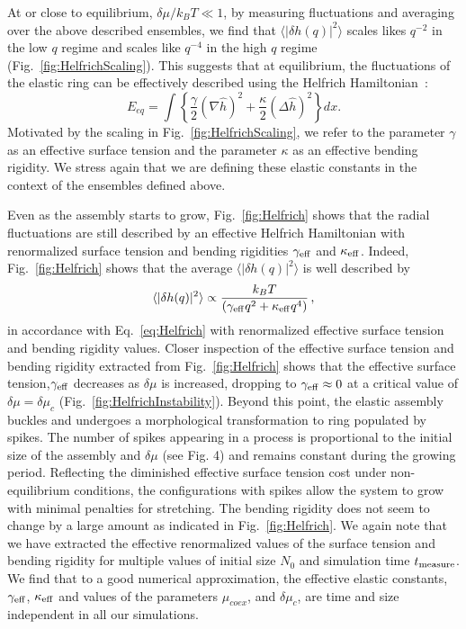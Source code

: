 \documentclass[amsmath,preprintnumbers,10pt,nofootinbib,prl,twocolumn]{revtex4-1}
\begin{document}
At or close to equilibrium, $\delta \mu /k_B T \ll 1$, by measuring fluctuations and averaging over the above described ensembles, we find that $\langle |\delta h(q)|^2 \rangle$ scales likes $q^{-2}$ in the low $q$ regime and scales like $q^{-4}$ in the high $q$ regime (Fig.~\ref{fig:HelfrichScaling}). This suggests that 
at equilibrium, the fluctuations of the elastic ring can be effectively described using the Helfrich Hamiltonian~\cite{W.Helfrich1973}:
\begin{equation}
E_{eq}=\int \left \{\frac{\gamma}{2} (\nabla \hat{h})^2+  \frac{\kappa}{2} (\Delta \hat{h})^2\right \} dx.
\label{eq:Helfrich}
\end{equation}
Motivated by the scaling in Fig.~\ref{fig:HelfrichScaling}, we refer to the parameter $\gamma$ as an effective surface tension and the parameter $\kappa$ as an effective bending rigidity. We stress again that we are defining these elastic constants in the context of the ensembles defined above. 

Even as the assembly starts to grow, Fig.~\ref{fig:Helfrich} shows that the radial fluctuations are still described by an effective Helfrich Hamiltonian with renormalized surface tension and bending rigidities $\gamma_{\rm eff}$ and $\kappa_{\rm eff}$. Indeed, Fig.~\ref{fig:Helfrich} shows that the average $\langle |\delta h(q)|^2 \rangle$ is well described by 
\begin{equation}
\langle |\delta h(q)|^2 \rangle \propto \frac{k_B T}{(\gamma_{\rm eff} q^2 + \kappa_{\rm eff} q^4)}\,,
\label{eq:HelfrichFT}
\end{equation}
in accordance with Eq.~\ref{eq:Helfrich} with renormalized effective surface tension and bending rigidity values. Closer inspection of the effective surface tension and bending rigidity extracted from Fig.~\ref{fig:Helfrich} shows that the effective surface tension,$\gamma_{\rm eff}$ decreases as $\delta \mu$ is increased, dropping to $\gamma_{\rm eff}\approx 0$ at a critical value of $\delta \mu=\delta \mu_c$ (Fig.~\ref{fig:HelfrichInstability}). Beyond this point, the elastic assembly buckles and undergoes a morphological transformation to ring populated by \textit{}{spikes}. The number of spikes appearing in a process is proportional to the initial size of the assembly and $\delta\mu$ (see Fig. 4) and remains constant during the growing period. 
Reflecting the diminished effective surface tension cost under non-equilibrium conditions, the configurations with spikes allow the system to grow with minimal penalties for stretching. The bending rigidity does not seem to change by a large amount as indicated in Fig.~\ref{fig:Helfrich}. We again note that we have extracted the effective renormalized values of the surface tension and bending rigidity for multiple values of initial size $N_0$ and simulation time $t_{\rm measure}$. We find that to a good numerical approximation, the effective elastic constants, $\gamma_{\rm eff}$, $\kappa_{\rm eff}$ and values of the parameters $\mu_{coex}$, and $\delta \mu_c$, are time and size independent in all our simulations. 
\end{document}
